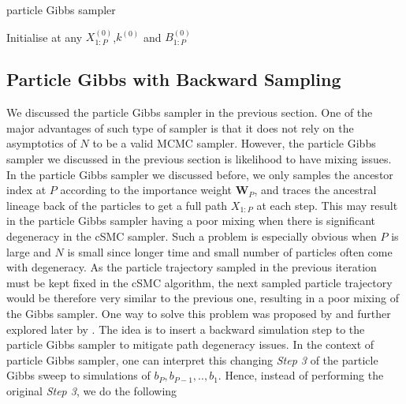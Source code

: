 \documentclass[12pt,a4paper]{article}
\begin{document}
\begin{algorithm}[htb!]
    \caption{particle Gibbs sampler}\label{Alg: PG}
        Initialise at any $X_{1:P}^{(0)}$,$k^{(0)}$ and $B_{1:P}^{(0)}$\;
\end{algorithm}
\subsection{Particle Gibbs with Backward Sampling}\label{Section-BackwardSimulation}
We discussed the particle Gibbs sampler in the previous section. One of the major advantages of such type of sampler is that it does not rely on the asymptotics of \(N\) to be a valid MCMC sampler. However, the particle Gibbs sampler we discussed in the previous section is likelihood to have mixing issues. In the particle Gibbs sampler we discussed before, we only samples the ancestor index at $P$ according to the importance weight $\mathbf{W}_P$, and traces the ancestral lineage back of the particles to get a full path $X_{1:P}$ at each step. This may result in the particle Gibbs sampler having a poor mixing when there is significant degeneracy in the cSMC sampler. Such a problem is especially obvious when $P$ is large and $N$ is small since longer time and small number of particles often come with degeneracy. As the particle trajectory sampled in the previous iteration must be kept fixed in the cSMC algorithm, the next sampled particle trajectory would be therefore very similar to the previous one, resulting in a poor mixing of the Gibbs sampler. One way to solve this problem was proposed by \cite{whiteley2014backwardsampling} and further explored later by \cite{lindsten2012use}. The idea is to insert a backward simulation step to the particle Gibbs sampler to mitigate path degeneracy issues. In the context of particle Gibbs sampler, one can interpret this changing \textit{Step 3} of the particle Gibbs sweep to simulations of \(b_P,b_{P-1},..,b_1\). Hence, instead of performing the original \textit{Step 3}, we do the following
\end{document}
